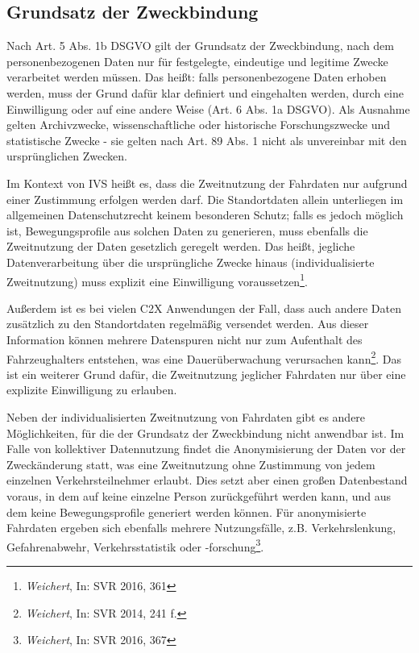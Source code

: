 \subsection{Grundsatz der Zweckbindung}

Nach Art. 5 Abs. 1b DSGVO gilt der Grundsatz der Zweckbindung, nach dem personenbezogenen Daten nur für festgelegte, eindeutige und legitime Zwecke verarbeitet werden müssen. Das heißt: falls personenbezogene Daten erhoben werden, muss der Grund dafür klar definiert und eingehalten werden, durch eine Einwilligung oder auf eine andere Weise (Art. 6 Abs. 1a DSGVO). Als Ausnahme gelten Archivzwecke, wissenschaftliche oder historische Forschungszwecke und statistische Zwecke - sie gelten nach Art. 89 Abs. 1 nicht als unvereinbar mit den ursprünglichen Zwecken. 

Im Kontext von IVS heißt es, dass die Zweitnutzung der Fahrdaten nur aufgrund einer Zustimmung erfolgen werden darf. Die Standortdaten allein unterliegen im allgemeinen Datenschutzrecht keinem besonderen Schutz; falls es jedoch möglich ist, Bewegungsprofile aus solchen Daten zu generieren, muss ebenfalls die Zweitnutzung der Daten gesetzlich geregelt werden. Das heißt, jegliche Datenverarbeitung über die ursprüngliche Zwecke hinaus (individualisierte Zweitnutzung) muss explizit eine Einwilligung voraussetzen\footnote{\emph{Weichert}, In: SVR 2016, 361}.

Außerdem ist es bei vielen C2X Anwendungen der Fall, dass auch andere Daten zusätzlich zu den Standortdaten regelmäßig versendet werden. Aus dieser Information können mehrere Datenspuren nicht nur zum Aufenthalt des Fahrzeughalters entstehen, was eine Dauerüberwachung verursachen kann\footnote{\emph{Weichert}, In: SVR 2014, 241 f.}. Das ist ein weiterer Grund dafür, die Zweitnutzung jeglicher Fahrdaten nur über eine explizite Einwilligung zu erlauben. 

Neben der individualisierten Zweitnutzung von Fahrdaten gibt es andere Möglichkeiten, für die der Grundsatz der Zweckbindung nicht anwendbar ist. Im Falle von kollektiver Datennutzung findet die Anonymisierung der Daten vor der Zweckänderung statt, was eine Zweitnutzung ohne Zustimmung von jedem einzelnen Verkehrsteilnehmer erlaubt. Dies setzt aber einen großen Datenbestand voraus, in dem auf keine einzelne Person zurückgeführt werden kann, und aus dem keine Bewegungsprofile generiert werden können. Für anonymisierte Fahrdaten ergeben sich ebenfalls mehrere Nutzungsfälle, z.B. Verkehrslenkung, Gefahrenabwehr, Verkehrsstatistik oder -forschung\footnote{\emph{Weichert}, In: SVR 2016, 367}.

